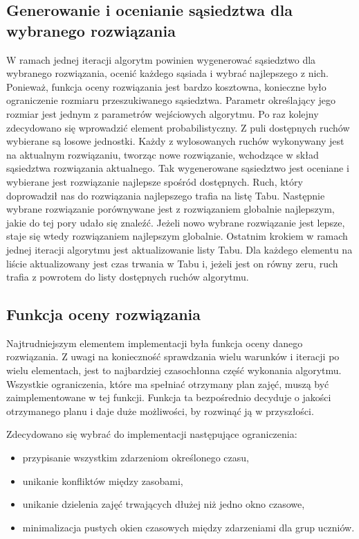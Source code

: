 \subsection{Generowanie i ocenianie sąsiedztwa dla wybranego rozwiązania}

W ramach jednej iteracji algorytm powinien wygenerować sąsiedztwo dla wybranego rozwiązania, ocenić każdego sąsiada i wybrać najlepszego z nich. Ponieważ, funkcja oceny rozwiązania jest bardzo kosztowna, konieczne było ograniczenie rozmiaru przeszukiwanego sąsiedztwa. Parametr określający jego rozmiar jest jednym z parametrów wejściowych algorytmu. Po raz kolejny zdecydowano się wprowadzić element probabilistyczny. Z puli dostępnych ruchów wybierane są losowe jednostki. Każdy z wylosowanych ruchów wykonywany jest na aktualnym rozwiązaniu, tworząc nowe rozwiązanie, wchodzące w skład sąsiedztwa rozwiązania aktualnego. Tak wygenerowane sąsiedztwo jest oceniane i wybierane jest rozwiązanie najlepsze spośród dostępnych. Ruch, który doprowadził nas do rozwiązania najlepszego trafia na listę Tabu. Następnie wybrane rozwiązanie porównywane jest z rozwiązaniem globalnie najlepszym, jakie do tej pory udało się znaleźć. Jeżeli nowo wybrane rozwiązanie jest lepsze, staje się wtedy rozwiązaniem najlepszym globalnie. Ostatnim krokiem w ramach jednej iteracji algorytmu jest aktualizowanie listy Tabu. Dla każdego elementu na liście aktualizowany jest czas trwania w Tabu i, jeżeli jest on równy zeru, ruch trafia z powrotem do listy dostępnych ruchów algorytmu.

\subsection{Funkcja oceny rozwiązania}

Najtrudniejszym elementem implementacji była funkcja oceny danego rozwiązania. Z uwagi na konieczność sprawdzania wielu warunków i iteracji po wielu elementach, jest to najbardziej czasochłonna część wykonania algorytmu. Wszystkie ograniczenia, które ma spełniać otrzymany plan zajęć, muszą być zaimplementowane w tej funkcji. Funkcja ta bezpośrednio decyduje o jakości otrzymanego planu i daje duże możliwości, by rozwinąć ją w przyszłości.

Zdecydowano się wybrać do implementacji następujące ograniczenia:
\begin{itemize}
\item przypisanie wszystkim zdarzeniom określonego czasu,
\item unikanie konfliktów między zasobami,
\item unikanie dzielenia zajęć trwających dłużej niż jedno okno czasowe,
\item minimalizacja pustych okien czasowych między zdarzeniami dla grup uczniów.
\end{itemize}

